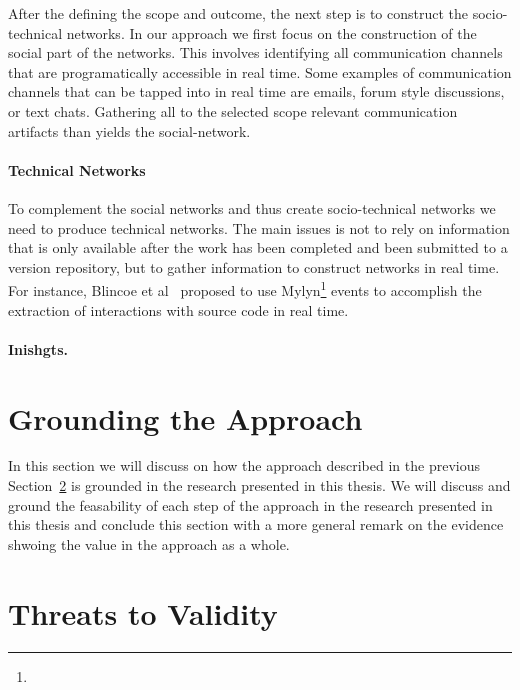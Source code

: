After the defining the scope and outcome, the next step is to construct the socio-technical networks.
In our approach we first focus on the construction of the social part of the networks.
This involves identifying all communication channels that are programatically accessible in real time.
Some examples of communication channels that can be tapped into in real time are emails, forum style discussions, or text chats.
Gathering all to the selected scope relevant communication artifacts than yields the social-network.

\paragraph{Technical Networks}
To complement the social networks and thus create socio-technical networks we need to produce technical networks.
The main issues is not to rely on information that is only available after the work has been completed and been submitted to a version repository, but to gather information to construct networks in real time.
For instance, Blincoe et al~\cite{} proposed to use Mylyn\footnote{} events to accomplish the extraction of interactions with source code in real time.

\paragraph{Inishgts.}


\section{Grounding the Approach}
In this section we will discuss on how the approach described in the previous Section~\ref{} is grounded in the research presented in this thesis.
We will discuss and ground the feasability of each step of the approach in the research presented in this thesis and conclude this section with a more general remark on the evidence shwoing the value in the approach as a whole.



\section{Threats to Validity}
